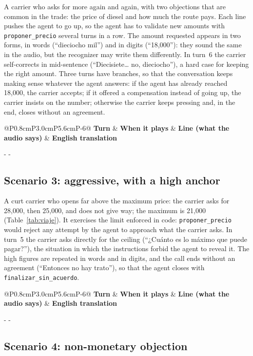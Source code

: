 \documentclass[11pt]{article}
\makeatletter
\newcommand{\need}[1]{\par\penalty-100\begingroup
  \setlength{\dimen@}{#1}%
  \dimen@ii\pagegoal \advance\dimen@ii-\pagetotal
  \ifdim\dimen@>\dimen@ii \ifdim\dimen@ii>\z@\vfil\fi \penalty-\@M \fi
  \endgroup}
\newenvironment{scripttable}[2]{%
\begin{table}[H]
\centering
\caption{#1}
\label{#2}
\footnotesize
\renewcommand{\arraystretch}{1.15}
\setlength{\tabcolsep}{4pt}
\begin{tabular}{@{}P{0.8cm}P{3.0cm}P{5.6cm}P{\dimexpr\linewidth-9.4cm-6\tabcolsep\relax}@{}}
\toprule
\textbf{Turn} & \textbf{When it plays} & \textbf{Line (what the audio says)} & \textbf{English translation}\\
\midrule}{%
\bottomrule
\end{tabular}
\end{table}}
\makeatother
\begin{document}
A carrier who asks for more again and again, with two objections that are common in
the trade: the price of diesel and how much the route pays. Each line pushes the
agent to go up, so the agent has to validate new amounts with
\texttt{proponer\_precio} several turns in a row. The amount requested appears in
two forms, in words (``dieciocho mil'') and in digits (``18,000''): they sound the
same in the audio, but the recognizer may write them differently. In turn~6 the
carrier self-corrects in mid-sentence (``Diecisiete\ldots{} no, dieciocho''), a hard
case for keeping the right amount. Three turns have branches, so that the
conversation keeps making sense whatever the agent answers: if the agent has
already reached 18,000, the carrier accepts; if it offered a compensation instead
of going up, the carrier insists on the number; otherwise the carrier keeps
pressing and, in the end, closes without an agreement.

\begin{scripttable}{Scenario 2, moderate haggler: the carrier's lines.}{tab:guion-e2}
\end{scripttable}

\need{10.5cm}
\subsection{Scenario 3: aggressive, with a high anchor}

A curt carrier who opens far above the maximum price: the carrier asks for 28,000,
then 25,000, and does not give way; the maximum is 21,000 (Table~\ref{tab:viaje}).
It exercises the limit enforced in code: \texttt{proponer\_precio} would reject any
attempt by the agent to approach what the carrier asks. In turn~5 the carrier asks
directly for the ceiling (``¿Cuánto es lo máximo que puede pagar?''), the situation
in which the instructions forbid the agent to reveal it. The high figures are
repeated in words and in digits, and the call ends without an agreement (``Entonces
no hay trato''), so that the agent closes with \texttt{finalizar\_sin\_acuerdo}.

\begin{scripttable}{Scenario 3, aggressive with a high anchor: the carrier's lines.}{tab:guion-e3}
\end{scripttable}

\need{13.5cm}
\subsection{Scenario 4: non-monetary objection}
\end{document}

